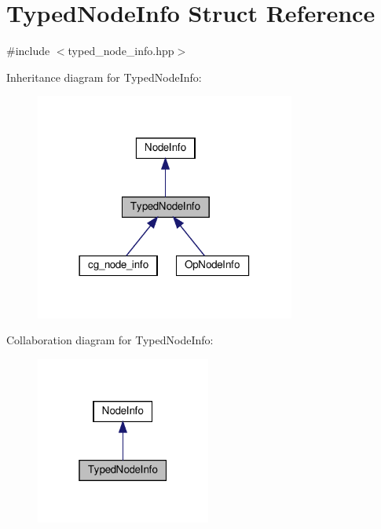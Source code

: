 \hypertarget{structTypedNodeInfo}{}\section{Typed\+Node\+Info Struct Reference}
\label{structTypedNodeInfo}


{\ttfamily \#include $<$typed\+\_\+node\+\_\+info.\+hpp$>$}



Inheritance diagram for Typed\+Node\+Info\+:
\nopagebreak
\begin{figure}[H]
\begin{center}
\leavevmode
\includegraphics[width=242pt]{d1/d6a/structTypedNodeInfo__inherit__graph}
\end{center}
\end{figure}


Collaboration diagram for Typed\+Node\+Info\+:
\nopagebreak
\begin{figure}[H]
\begin{center}
\leavevmode
\includegraphics[width=163pt]{d9/dd1/structTypedNodeInfo__coll__graph}
\end{center}
\end{figure}
